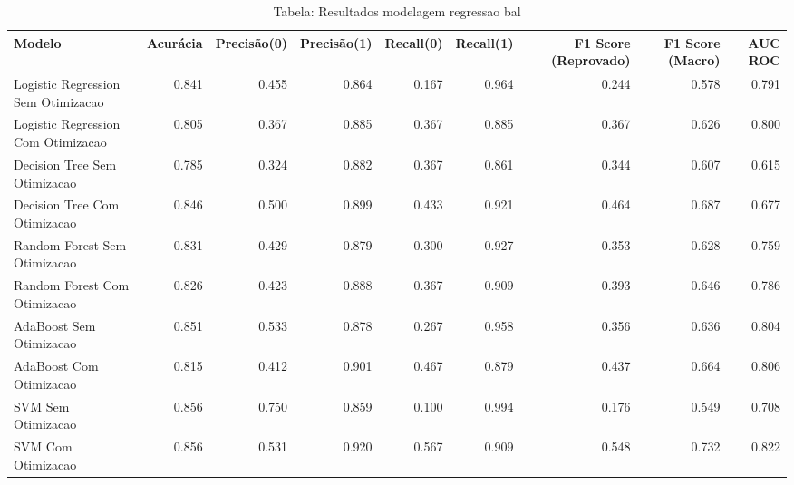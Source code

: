 \begin{table}[H] %
    \centering
    \caption{Tabela: Resultados modelagem regressao bal}
    \label{tab:resultados_modelagem_regressao_bal}
    \renewcommand{\arraystretch}{1.25} %
    \begin{adjustwidth}{ -1in }{ -1in } %
    \centering %
    \small %
    \begin{tabular}{lrrrrrrrr}
\toprule
                            Modelo &  Acurácia &  Precisão(0) &  Precisão(1) &  Recall(0) &  Recall(1) &  F1 Score (Reprovado) &  F1 Score (Macro) &  AUC ROC \\
\midrule
Logistic Regression Sem Otimizacao &     0.841 &        0.455 &        0.864 &      0.167 &      0.964 &                 0.244 &             0.578 &    0.791 \\
Logistic Regression Com Otimizacao &     0.805 &        0.367 &        0.885 &      0.367 &      0.885 &                 0.367 &             0.626 &    0.800 \\
      Decision Tree Sem Otimizacao &     0.785 &        0.324 &        0.882 &      0.367 &      0.861 &                 0.344 &             0.607 &    0.615 \\
      Decision Tree Com Otimizacao &     0.846 &        0.500 &        0.899 &      0.433 &      0.921 &                 0.464 &             0.687 &    0.677 \\
      Random Forest Sem Otimizacao &     0.831 &        0.429 &        0.879 &      0.300 &      0.927 &                 0.353 &             0.628 &    0.759 \\
      Random Forest Com Otimizacao &     0.826 &        0.423 &        0.888 &      0.367 &      0.909 &                 0.393 &             0.646 &    0.786 \\
           AdaBoost Sem Otimizacao &     0.851 &        0.533 &        0.878 &      0.267 &      0.958 &                 0.356 &             0.636 &    0.804 \\
           AdaBoost Com Otimizacao &     0.815 &        0.412 &        0.901 &      0.467 &      0.879 &                 0.437 &             0.664 &    0.806 \\
                SVM Sem Otimizacao &     0.856 &        0.750 &        0.859 &      0.100 &      0.994 &                 0.176 &             0.549 &    0.708 \\
                SVM Com Otimizacao &     0.856 &        0.531 &        0.920 &      0.567 &      0.909 &                 0.548 &             0.732 &    0.822 \\
\bottomrule
\end{tabular}
    \end{adjustwidth}
    \renewcommand{\arraystretch}{1.0} %
\end{table}
